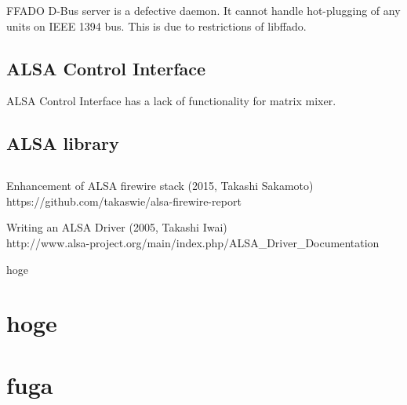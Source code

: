 \documentclass[onecolumn]{article}
\begin{document}
FFADO D-Bus server is a defective daemon. It cannot handle hot-plugging of any units on IEEE 1394 bus. This is due to restrictions of libffado.

\subsection{ALSA Control Interface}

ALSA Control Interface has a lack of functionality for matrix mixer.

\subsection{ALSA library}



\subsection{}
\subsection{}

\newpage

\begin{thebibliography}{99}


Enhancement of ALSA firewire stack (2015, Takashi Sakamoto) \\
https://github.com/takaswie/alsa-firewire-report

Writing an ALSA Driver (2005, Takashi Iwai) \\
http://www.alsa-project.org/main/index.php/ALSA\_Driver\_Documentation

hoge

\end{thebibliography}

\newpage

\appendix


\section{hoge}

\section{fuga}
\end{document}
